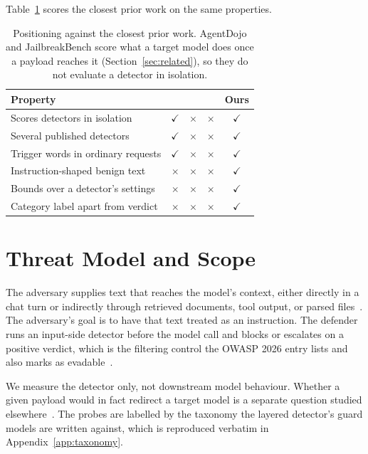 \documentclass[conference]{IEEEtran}
\begin{document}
Table~\ref{tab:positioning} scores the closest prior work on the same
properties.

\begin{table}[t]
\centering
\caption{Positioning against the closest prior work. AgentDojo and
JailbreakBench score what a target model does once a payload reaches it
(Section~\ref{sec:related}), so they do not evaluate a detector in
isolation.}
\label{tab:positioning}
\footnotesize
\setlength{\tabcolsep}{3pt}
\begin{tabular}{lcccc}
\toprule
Property & \cite{li2024injecguard} & \cite{debenedetti2024agentdojo} & \cite{chao2024jailbreakbench} & Ours \\
\midrule
Scores detectors in isolation & $\checkmark$ & $\times$ & $\times$ & $\checkmark$ \\
Several published detectors & $\checkmark$ & $\times$ & $\times$ & $\checkmark$ \\
Trigger words in ordinary requests & $\checkmark$ & $\times$ & $\times$ & $\checkmark$ \\
Instruction-shaped benign text & $\times$ & $\times$ & $\times$ & $\checkmark$ \\
Bounds over a detector's settings & $\times$ & $\times$ & $\times$ & $\checkmark$ \\
Category label apart from verdict & $\times$ & $\times$ & $\times$ & $\checkmark$ \\
\bottomrule
\end{tabular}
\end{table}

\section{Threat Model and Scope}\label{sec:threat}

The adversary supplies text that reaches the model's context, either directly
in a chat turn or indirectly through retrieved documents, tool output, or
parsed files~\cite{greshake2023not}. The adversary's goal is to have that text
treated as an instruction. The defender runs an input-side detector before the
model call and blocks or escalates on a positive verdict, which is the
filtering control the OWASP 2026 entry lists and also marks as
evadable~\cite{owasp2026}.

We measure the detector only, not downstream model behaviour. Whether a given
payload would in fact redirect a target model is a separate question studied
elsewhere~\cite{perez2022ignore, liu2024formalizing}. The probes are labelled
by the taxonomy the layered detector's guard models are written against, which is
reproduced verbatim in Appendix~\ref{app:taxonomy}.
\end{document}
